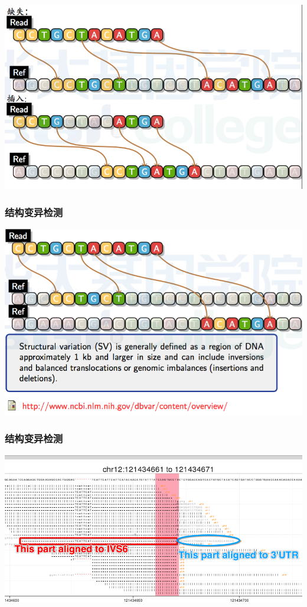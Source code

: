 \documentclass[12pt]{beamer}
\begin{document}
\begin{frame}
  \includegraphics[width=\textwidth]{figures/old_slides/indel1.png}
\end{frame}

\begin{frame}\frametitle{结构变异检测}
  \includegraphics[width=\textwidth]{figures/old_slides/sv.png}  
\end{frame}

\begin{frame}\frametitle{结构变异检测}
  \includegraphics[width=\textwidth]{figures/softclip.png}  
\end{frame}
\end{document}
